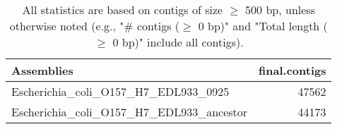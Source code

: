 \documentclass[12pt,a4paper]{article}
\begin{document}
\begin{table}[ht]
\begin{center}
\caption{All statistics are based on contigs of size $\geq$ 500 bp, unless otherwise noted (e.g., "\# contigs ($\geq$ 0 bp)" and "Total length ($\geq$ 0 bp)" include all contigs).}
\begin{tabular}{|l*{1}{|r}|}
\hline
Assemblies & final.contigs \\ \hline
Escherichia\_coli\_O157\_H7\_EDL933\_0925 & 47562 \\ \hline
Escherichia\_coli\_O157\_H7\_EDL933\_ancestor & 44173 \\ \hline
\end{tabular}
\end{center}
\end{table}
\end{document}
